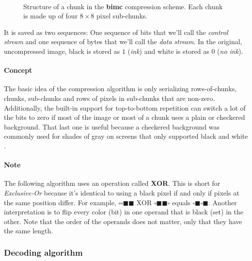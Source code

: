 \begin{figure}[h]
    \centering
      \\[1mm]
     
    \caption{Structure of a chunk in the \textbf{bimc} compression scheme. Each chunk is made up of four $8 \times 8$ pixel sub-chunks.}
    \label{fig:bimc_subchunk_layout}
\end{figure}

It is saved as two sequences: One sequence of bits that we'll call the \textit{control stream} and one sequence of \glspl{byte} that we'll call the \textit{data stream}. In the original, uncompressed image, black is stored as $1$ (\textit{ink}) and white is stored as $0$ (\textit{no ink}).

\paragraph{Concept}
The basic idea of the compression algorithm is only serializing rows-of-chunks, chunks, sub-chunks and rows of pixels in sub-chunks that are non-zero. Additionally, the built-in support for top-to-bottom repetition can switch a lot of the bits to zero if most of the image or most of a chunk uses a plain or checkered background. That last one is useful because a checkered background was commonly used for shades of gray on screens that only supported black and white \cite{toshyp:VDIpatterns}.

\newcommand{\ws}{\square}
\newcommand{\bs}{\blacksquare}
\newcommand{\wbyte}{$\ws\ws\ws\ws\ws\ws\ws\ws$}
\newcommand{\bbyte}{$\bs\bs\bs\bs\bs\bs\bs\bs$}
\newcommand{\wbbyte}{$\ws\bs\ws\bs\ws\bs\ws\bs$}
\newcommand{\bwbyte}{$\bs\ws\bs\ws\bs\ws\bs\ws$}

\paragraph{Note}
The following algorithm uses an operation called \textbf{XOR}. This is short for \textit{Exclusive-Or} because it's identical to using a black pixel if and only if pixels at the same position differ. For example, $\ws\ws\bs\bs \text{ XOR } \ws\bs\bs\ws$ equals $\ws\bs\ws\bs$. Another interpretation is to flip every color (bit) in one operand that is black (set) in the other. Note that the order of the operands does not matter, only that they have the same length.

\subsubsection{Decoding algorithm}

